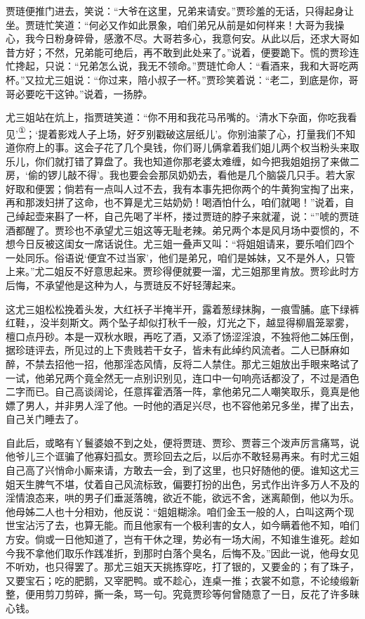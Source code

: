 贾琏便推门进去，笑说：``大爷在这里，兄弟来请安。''贾珍羞的无话，只得起身让坐。贾琏忙笑道：``何必又作如此景象，咱们弟兄从前是如何样来！大哥为我操心，我今日粉身碎骨，感激不尽。大哥若多心，我意何安。从此以后，还求大哥如昔方好；不然，兄弟能可绝后，再不敢到此处来了。''说着，便要跪下。慌的贾珍连忙搀起，只说：``兄弟怎么说，我无不领命。''贾琏忙命人：``看酒来，我和大哥吃两杯。''又拉尤三姐说：``你过来，陪小叔子一杯。''贾珍笑着说：``老二，到底是你，哥哥必要吃干这钟。''说着，一扬脖。

尤三姐站在炕上，指贾琏笑道：``你不用和我花马吊嘴的。`清水下杂面，你吃我看见'\href{../Text/part0069_split_000.html\#lnkback_1_a}{\textsuperscript{①}}；`提着影戏人子上场，好歹别戳破这层纸儿'。你别油蒙了心，打量我们不知道你府上的事。这会子花了几个臭钱，你们哥儿俩拿着我们姐儿两个权当粉头来取乐儿，你们就打错了算盘了。我也知道你那老婆太难缠，如今把我姐姐拐了来做二房，`偷的锣儿敲不得'。我也要会会那凤奶奶去，看他是几个脑袋几只手。若大家好取和便罢；倘若有一点叫人过不去，我有本事先把你两个的牛黄狗宝掏了出来，再和那泼妇拼了这命，也不算是尤三姑奶奶！喝酒怕什么，咱们就喝！''说着，自己绰起壶来斟了一杯，自己先喝了半杯，搂过贾琏的脖子来就灌，说：``''唬的贾琏酒都醒了。贾珍也不承望尤三姐这等无耻老辣。弟兄两个本是风月场中耍惯的，不想今日反被这闺女一席话说住。尤三姐一叠声又叫：``将姐姐请来，要乐咱们四个一处同乐。俗语说`便宜不过当家'，他们是弟兄，咱们是姊妹，又不是外人，只管上来。''尤二姐反不好意思起来。贾珍得便就要一溜，尤三姐那里肯放。贾珍此时方后悔，不承望他是这种为人，与贾琏反不好轻薄起来。

这尤三姐松松挽着头发，大红袄子半掩半开，露着葱绿抹胸，一痕雪脯。底下绿裤红鞋，，没半刻斯文。两个坠子却似打秋千一般，灯光之下，越显得柳眉笼翠雾，檀口点丹砂。本是一双秋水眼，再吃了酒，又添了饧涩淫浪，不独将他二姊压倒，据珍琏评去，所见过的上下贵贱若干女子，皆未有此绰约风流者。二人已酥麻如醉，不禁去招他一招，他那淫态风情，反将二人禁住。那尤三姐放出手眼来略试了一试，他弟兄两个竟全然无一点别识别见，连口中一句响亮话都没了，不过是酒色二字而已。自己高谈阔论，任意挥霍洒落一阵，拿他弟兄二人嘲笑取乐，竟真是他嫖了男人，并非男人淫了他。一时他的酒足兴尽，也不容他弟兄多坐，撵了出去，自己关门睡去了。

自此后，或略有丫鬟婆娘不到之处，便将贾琏、贾珍、贾蓉三个泼声厉言痛骂，说他爷儿三个诓骗了他寡妇孤女。贾珍回去之后，以后亦不敢轻易再来。有时尤三姐自己高了兴悄命小厮来请，方敢去一会，到了这里，也只好随他的便。谁知这尤三姐天生脾气不堪，仗着自己风流标致，偏要打扮的出色，另式作出许多万人不及的淫情浪态来，哄的男子们垂涎落魄，欲近不能，欲远不舍，迷离颠倒，他以为乐。他母姊二人也十分相劝，他反说：``姐姐糊涂。咱们金玉一般的人，白叫这两个现世宝沾污了去，也算无能。而且他家有一个极利害的女人，如今瞒着他不知，咱们方安。倘或一日他知道了，岂有干休之理，势必有一场大闹，不知谁生谁死。趁如今我不拿他们取乐作践准折，到那时白落个臭名，后悔不及。''因此一说，他母女见不听劝，也只得罢了。那尤三姐天天挑拣穿吃，打了银的，又要金的；有了珠子，又要宝石；吃的肥鹅，又宰肥鸭。或不趁心，连桌一推；衣裳不如意，不论绫缎新整，便用剪刀剪碎，撕一条，骂一句。究竟贾珍等何曾随意了一日，反花了许多昧心钱。

